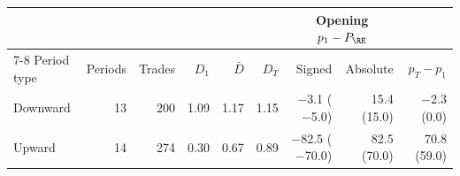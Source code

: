 \begin{tabular}{lrrrrrrrr}
\toprule
 & & & & & & \multicolumn{2}{c}{Opening $p_1-P_{\RE}$} & \\
\cmidrule(lr){7-8}
Period type & Periods & Trades & $D_1$ & $\bar D$ & $D_T$ & Signed & Absolute & $p_T-p_1$ \\
\midrule
Downward & 13 & 200 & 1.09 & 1.17 & 1.15 & $-$3.1 ($-$5.0) & 15.4 (15.0) & $-$2.3 (0.0) \\
Upward & 14 & 274 & 0.30 & 0.67 & 0.89 & $-$82.5 ($-$70.0) & 82.5 (70.0) & 70.8 (59.0) \\
\bottomrule
\end{tabular}
